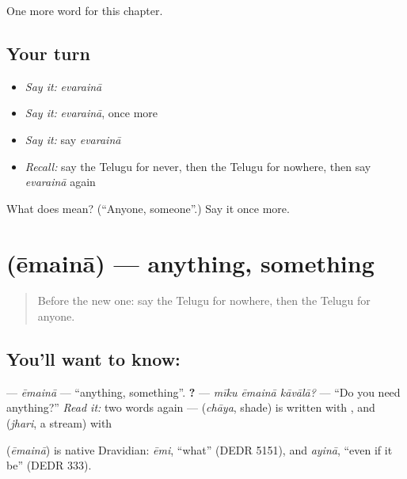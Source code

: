 \begin{grammarlens}[title={What you've built}]
One more word for this chapter.
\end{grammarlens}

\subsection*{Your turn}
\begin{itemize}
\raggedright
  \item \emph{Say it:} \emph{evarainā}
  \item \emph{Say it:} \emph{evarainā}, once more
  \item \emph{Say it:} say \emph{evarainā}
  \item \emph{Recall:} say the Telugu for never, then the Telugu for nowhere, then say \emph{evarainā} again
\end{itemize}

\begin{tcolorbox}[breakable,colback=teal!4,colframe=teal!35!black,title={Before you move on}]
What does  mean? (\textquotedblleft{}Anyone, someone\textquotedblright{}.) Say it once more.
\end{tcolorbox}
\section[\texorpdfstring{\te{ఏమైనా} (ēmainā)}{ఏమైనా (ēmainā)}]{ (ēmainā) — anything, something}

\label{lesson:TE-C153-emaina}



\begin{quote}
Before the new one: say the Telugu for nowhere, then the Telugu for anyone.
\end{quote}

\subsection*{You'll want to know: }
\textbf{} — \emph{ēmainā} — \textquotedblleft{}anything, something\textquotedblright{}. \textbf{  ?} — \emph{mīku ēmainā kāvālā?} — \textquotedblleft{}Do you need anything?\textquotedblright{} \emph{Read it:} two words again — \textbf{} (\emph{chāya}, shade) is written with , and \textbf{} (\emph{jhari}, a stream) with 

\begin{cousinweb}
\textbf{} (\emph{ēmainā}) is native Dravidian: \emph{ēmi}, \textquotedblleft{}what\textquotedblright{} (DEDR 5151), and \emph{ayinā}, \textquotedblleft{}even if it be\textquotedblright{} (DEDR 333).
\end{cousinweb}

